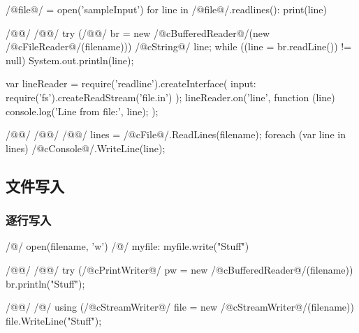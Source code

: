 \documentclass[hidelinks]{ctexart}
\begin{document}
\begin{pylst}
/@file@/ = open('sampleInput')
for line in /@file@/.readlines():
    print(line)
\end{pylst}
\begin{javalst}
/@@/
/@\lhend @/
try (/@\lstvar @/ br = new /@\+c{BufferedReader}@/(new /@\+c{FileReader}@/(filename))) {
    /@\+c{String}@/ line;
    while ((line = br.readLine()) != null) {
       System.out.println(line);
    }
}
\end{javalst}
\begin{nodejslst}
var lineReader = require('readline').createInterface({
    input: require('fs').createReadStream('file.in')
});
lineReader.on('line', function (line) {
    console.log('Line from file:', line);
});
\end{nodejslst}
\begin{cshlst}
/@@/
/@\lhend @/
/@\lstvar @/ lines = /@\+c{File}@/.ReadLines(filename);
foreach (var line in lines)
    /@\+c{Console}@/.WriteLine(line);
\end{cshlst}



\subsection{文件写入} %
\label{sub:文件写入}

\subsubsection{逐行写入} %
\label{ssub:逐行写入}

\begin{pylst}
/@\pywith@/ open(filename, 'w') /@\pyas@/ myfile:
    myfile.write("Stuff")
\end{pylst}
\begin{javalst}
/@@/
/@\lhend @/
try (/@\+c{PrintWriter}@/ pw = new /@\+c{BufferedReader}@/(filename)) {
    br.println("Stuff");
}
\end{javalst}
\begin{cshlst}
/@@/
/@\lhend@/
using (/@\+c{StreamWriter}@/ file = new /@\+c{StreamWriter}@/(filename))
{
    file.WriteLine("Stuff");
}
\end{cshlst}

\end{document}
